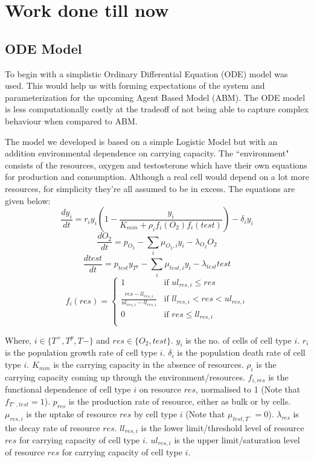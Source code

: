 \documentclass[11pt,a4paper]{article}
\begin{document}
\section{Work done till now}
\subsection{ODE Model}
To begin with a simplistic Ordinary Differential Equation (ODE) model was used. This would help us with forming expectations of the system and parameterization for the upcoming Agent Based Model (ABM). The ODE model is less computationally costly at the tradeoff of not being able to capture complex behaviour when compared to ABM.

The model we developed is based on a simple Logistic Model \cite{Logistic} but with an addition environmental dependence on carrying capacity. The ``environment" consists of the resources, oxygen and testosterone which have their own equations for production and consumption. Although a real cell would depend on a lot more resources, for simplicity they're all assumed to be in excess. The equations are given below:
\begin{equation}
  \frac{dy_i}{dt} = r_i y_i (1 - \frac{y_i}{K_{min} + \rho_i f_i(O_2) f_i(test)} )- \delta_i y_i
  \label{celleq}
\end{equation}
\begin{equation}
  \frac{dO_2}{dt} = p_{O_2} - \sum_i \mu_{O_2,i} y_i - \lambda_{O_2} O_2
  \label{o2eq}
\end{equation}
\begin{equation}
  \frac{dtest}{dt} = p_{test} y_{T^p} - \sum_i \mu_{test,i} y_i - \lambda_{test} test
  \label{testeq}
\end{equation}
\begin{equation}
  f_i(res) = \begin{cases}
    1 &\text{if } ul_{res,i} \leq res\\
    \frac{res-ll_{res,i}}{ul_{res,i}-ll_{res,i}} &\text{if } ll_{res,i} < res < ul_{res,i}\\
    0 &\text{if } res \leq ll_{res,i}\\
  \end{cases}
  \label{freseq}
\end{equation}

Where,
$i \in \{T^+,T^p,T-\}$ and $res \in \{O_2,test\}$.
$y_i$ is the no. of cells of cell type $i$.
$r_i$ is the population growth rate of cell type $i$.
$\delta_i$ is the population death rate of cell type $i$.
$K_{min}$ is the carrying capacity in the absence of resources. $\rho_i$ is the carrying capacity coming up through the environment/resources.
$f_{i,res}$ is the functional dependence of cell type $i$ on resource $res$, normalised to 1 (Note that $f_{T^-,test}=1$).
$p_{res}$ is the production rate of resource, either as bulk or by cells.
$\mu_{res,i}$ is the uptake of resource $res$ by cell type $i$ (Note that $\mu_{test,T^-} = 0$).
$\lambda_{res}$ is the decay rate of resource $res$.
$ll_{res,i}$ is the lower limit/threshold level of resource $res$ for carrying capacity of cell type $i$.
$ul_{res,i}$ is the upper limit/saturation level of resource $res$ for carrying capacity of cell type $i$.
\end{document}
